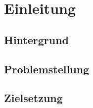 \section{Einleitung}

\subsection{Hintergrund}
\subsection{Problemstellung}
\subsection{Zielsetzung}
